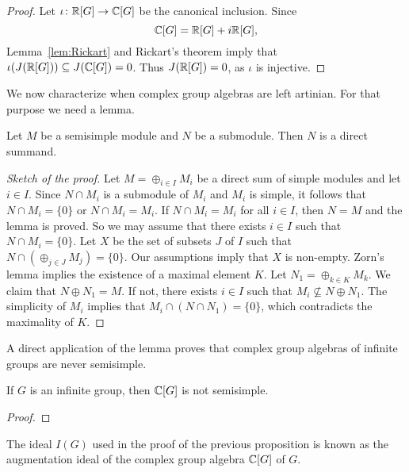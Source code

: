 \begin{proof}
	Let $\iota\colon \mathbb{R}[G]\to\mathbb{C}[G]$ be the canonical inclusion. Since 
	\[
	\mathbb{C}[G]=\mathbb{R}[G]+i\mathbb{R}[G],
	\]
	Lemma~\ref{lem:Rickart} and Rickart's theorem imply that 
	$\iota(J(\mathbb{R}[G]))\subseteq J(\mathbb{C}[G])=0$. Thus $J(\mathbb{R}[G])=0$, as $\iota$ is injective. 
\end{proof}

We now characterize when complex group algebras 
are left artinian. For that purpose
we need a lemma.

\begin{lemma}
    Let $M$ be a semisimple module and $N$ be a submodule. 
    Then $N$ is a direct summand.
\end{lemma}

\begin{proof}[Sketch of the proof]
    Let $M=\oplus_{i\in I}M_i$ be a direct sum of simple modules  
    and let $i\in I$. 
    Since $N\cap M_i$ is a submodule of $M_i$ and $M_i$ is simple, it follows
    that $N\cap M_i=\{0\}$ or $N\cap M_i=M_i$. If
    $N\cap M_i=M_i$ for all $i\in I$, then $N=M$ and the lemma is proved. So we may assume
    that there exists $i\in I$ such that $N\cap M_i=\{0\}$. Let $X$ be the set
    of subsets $J$ of $I$ such that $N\cap (\oplus_{j\in J}M_j)=\{0\}$. Our assumptions
    imply that $X$ is non-empty. Zorn's lemma implies the existence of 
    a maximal element $K$. Let $N_1=\oplus_{k\in K}M_k$. We claim that
    $N\oplus N_1=M$. If not, there exists $i\in I$ such that
    $M_i\not\subseteq N\oplus N_1$. The simplicity of $M_i$ implies that
    $M_i\cap (N\cap N_1)=\{0\}$, which contradicts the maximality of $K$. 
\end{proof}

A direct application of the lemma proves that
complex group algebras of infinite groups are never semisimple. 

\begin{proposition}
    If $G$ is an infinite group, then $\mathbb{C}[G]$ is not semisimple. 
\end{proposition}

\begin{proof}
\end{proof}

The ideal $I(G)$ used in the proof of the previous proposition 
is known as the augmentation ideal
of the complex group algebra $\mathbb{C}[G]$ of $G$. 

